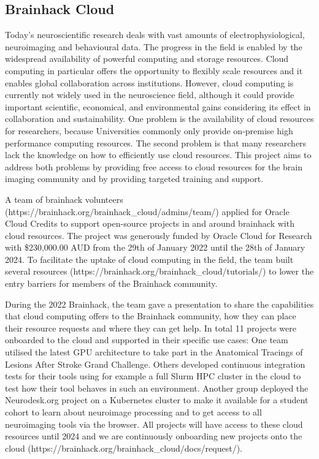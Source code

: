 \documentclass[../main.tex]{subfiles}
\begin{document}
\subsection{Brainhack Cloud}


Today’s neuroscientific research deals with vast amounts of electrophysiological, neuroimaging and behavioural data. The progress in the field is enabled by the widespread availability of powerful computing and storage resources. Cloud computing in particular offers the opportunity to flexibly scale resources and it enables global collaboration across institutions. However, cloud computing is currently not widely used in the neuroscience field, although it could provide important scientific, economical, and environmental gains considering its effect in collaboration and sustainability\citep{apon2015, OracleSustainabilty}. One problem is the availability of cloud resources for researchers, because Universities commonly only provide on-premise high performance computing resources. The second problem is that many researchers lack the knowledge on how to efficiently use cloud resources. This project aims to address both problems by providing free access to cloud resources for the brain imaging community and by providing targeted training and support.

A team of brainhack volunteers (https://brainhack.org/brainhack\_cloud/admins/team/) applied for Oracle Cloud Credits to support open-source projects in and around brainhack with cloud resources. The project was generously funded by Oracle Cloud for Research\citep{OracleResearch} with \$230,000.00 AUD from the 29th of January 2022 until the 28th of January 2024. To facilitate the uptake of cloud computing in the field, the team built several resources (https://brainhack.org/brainhack\_cloud/tutorials/) to lower the entry barriers for members of the Brainhack community. 

During the 2022 Brainhack, the team gave a presentation to share the capabilities that cloud computing offers to the Brainhack community, how they can place their resource requests and where they can get help. In total 11 projects were onboarded to the cloud and supported in their specific use cases: One team utilised the latest GPU architecture to take part in the Anatomical Tracings of Lesions After Stroke Grand Challenge. Others developed continuous integration tests for their tools using for example a full Slurm HPC cluster in the cloud to test how their tool behaves in such an environment. Another group deployed the Neurodesk.org\citep{NeuroDesk} project on a Kubernetes cluster to make it available for a student cohort to learn about neuroimage processing and to get access to all neuroimaging tools via the browser. All projects will have access to these cloud resources until 2024 and we are continuously onboarding new projects onto the cloud (https://brainhack.org/brainhack\_cloud/docs/request/).
\end{document}

